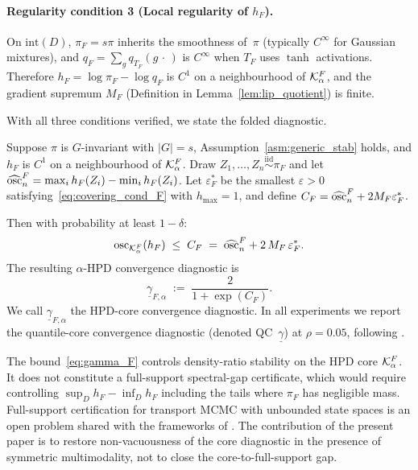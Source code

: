 \paragraph{Regularity condition 3 (Local regularity of $h_F$).}
On $\mathrm{int}(D)$, $\pi_F = s\pi$ inherits the smoothness
of~$\pi$ (typically $C^\infty$ for Gaussian mixtures), and
$q_F = \sum_g q_{T_F}(g\,\cdot\,)$ is $C^\infty$ when $T_F$
uses $\tanh$ activations.  Therefore $h_F = \log\pi_F - \log q_F$
is $C^1$ on a neighbourhood of $\mathcal{K}_\alpha^F$, and the gradient
supremum $M_F$ (Definition in Lemma~\ref{lem:lip_quotient}) is
finite.

\medskip
With all three conditions verified, we state the folded diagnostic.

\begin{theorem}\label{thm:folded_cert}
  Suppose $\pi$ is $G$-invariant with $|G| = s$,
  Assumption~\ref{asm:generic_stab} holds, and $h_F$ is $C^1$ on a
  neighbourhood of $\mathcal{K}_\alpha^F$.
  Draw $Z_1, \ldots, Z_n \overset{\mathrm{iid}}{\sim} \pi_F$ and
  let $\widehat{\mathrm{osc}}_n^F = \max_i h_F(Z_i) - \min_i h_F(Z_i)$.
  Let $\varepsilon_F^*$ be the smallest $\varepsilon > 0$
  satisfying~\eqref{eq:covering_cond_F} with $h_{\max} = 1$, and
  define $C_F = \widehat{\mathrm{osc}}_n^F + 2 M_F \varepsilon_F^*$.

  Then with probability at least $1 - \delta$:
  \begin{equation}\label{eq:osc_bound_F}
    \mathrm{osc}_{\mathcal{K}_\alpha^F}(h_F)
    \;\leq\; C_F
    \;=\; \widehat{\mathrm{osc}}_n^F + 2\,M_F\,\varepsilon_F^*.
  \end{equation}
  The resulting $\alpha$-HPD convergence diagnostic is
  \begin{equation}\label{eq:gamma_F}
    \underline{\gamma}_{F,\alpha}
    \;:=\; \frac{2}{1 + \exp(C_F)}.
  \end{equation}
  We call $\underline{\gamma}_{F,\alpha}$ the HPD-core
  convergence diagnostic.
  In all experiments we report the quantile-core convergence
  diagnostic (denoted QC~$\underline{\gamma}$) at $\rho = 0.05$,
  following \citet{CerTMCMC}.
\end{theorem}

\begin{remark}\label{rem:scope}
  The bound~\eqref{eq:gamma_F} controls density-ratio stability
  on the HPD core $\mathcal{K}_\alpha^F$.  It does not constitute a
  full-support spectral-gap certificate, which would require
  controlling $\sup_D h_F - \inf_D h_F$ including the tails where
  $\pi_F$ has negligible mass.  Full-support certification for
  transport MCMC with unbounded state spaces is an open problem
  shared with the frameworks of \citet{LCNF,CerTMCMC}.
  The contribution of the present paper is
  to restore non-vacuousness of the core diagnostic in the
  presence of symmetric multimodality, not to close the
  core-to-full-support gap.
\end{remark}

